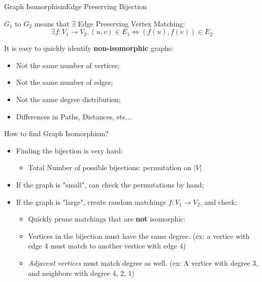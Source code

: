 \begin{frame}{Graph Isomorphism}{Edge Preserving Bijection}

    $G_1$  to $G_2$ means that $\exists$
    Edge Preserving Vertex Matching:
    \begin{equation*}
      \exists f:V_1 \rightarrow V_2,
      (u,v) \in E_1 \iff (f(u),f(v)) \in E_2
    \end{equation*}\bigskip

    It is easy to quickly identify {\bf \alert{non-isomorphic}} graphs:
    \begin{itemize}
    \item Not the same number of vertices;
    \item Not the same number of edges;
    \item Not the same degree distribution;
    \item Differences in Paths, Distances, etc...
    \end{itemize}
\end{frame}

\begin{frame}{How to find Graph Isomorphism?}
    \begin{itemize}
      \item Finding the bijection is very hard:
      \begin{itemize}
        \item Total Number of possible bijections: permutation on $|V|$
      \end{itemize}\bigskip

    \item If the graph is "small", can check the permutations by hand;\bigskip

    \item If the graph is "large", create random matchings $f: V_1 \rightarrow V_2$, and check:
      \begin{itemize}
        \item Quickly prune matchings that are {\bf not} isomorphic:
        \item Vertices in the bijection must have the same degree. (ex: a vertice with edge 4 must match to another vertice with edge 4)
        \item \emph{Adjacent vertices} must match degree as well. (ex: A vertice with degree 3, and neighbors with degree 4, 2, 1)
      \end{itemize}
    \end{itemize}
\end{frame}

